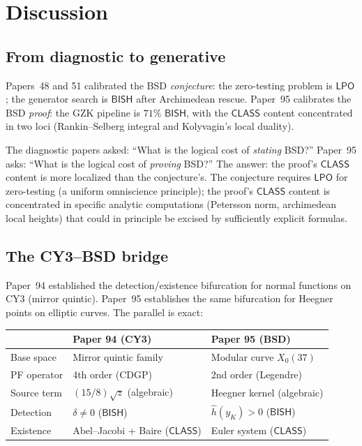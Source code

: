 \documentclass[11pt]{article}
\theoremstyle{plain}
\theoremstyle{definition}
\theoremstyle{remark}
\newcommand{\BISH}{\ensuremath{\mathsf{BISH}}}
\newcommand{\LPO}{\ensuremath{\mathsf{LPO}}}
\newcommand{\CLASS}{\ensuremath{\mathsf{CLASS}}}
\newcommand{\hhat}{\hat{h}}
\begin{document}
\section{Discussion}
\label{sec:discussion}

\subsection{From diagnostic to generative}

Papers~48 and 51 calibrated the BSD \emph{conjecture}: the zero-testing problem is $\LPO$; the generator search is $\BISH$ after Archimedean rescue. Paper~95 calibrates the BSD \emph{proof}: the GZK pipeline is $71\%$ $\BISH$, with the $\CLASS$ content concentrated in two loci (Rankin--Selberg integral and Kolyvagin's local duality).

The diagnostic papers asked: ``What is the logical cost of \emph{stating} BSD?'' Paper~95 asks: ``What is the logical cost of \emph{proving} BSD?'' The answer: the proof's $\CLASS$ content is more localized than the conjecture's. The conjecture requires $\LPO$ for zero-testing (a uniform omniscience principle); the proof's $\CLASS$ content is concentrated in specific analytic computations (Petersson norm, archimedean local heights) that could in principle be excised by sufficiently explicit formulas.

\subsection{The CY3--BSD bridge}

Paper~94 established the detection/existence bifurcation for normal functions on CY3 (mirror quintic). Paper~95 establishes the same bifurcation for Heegner points on elliptic curves. The parallel is exact:

\begin{center}
\begin{tabular}{lll}
\toprule
& \textbf{Paper 94 (CY3)} & \textbf{Paper 95 (BSD)} \\
\midrule
Base space & Mirror quintic family & Modular curve $X_0(37)$ \\
PF operator & 4th order (CDGP) & 2nd order (Legendre) \\
Source term & $(15/8)\sqrt{z}$ (algebraic) & Heegner kernel (algebraic) \\
Detection & $\delta \neq 0$ ($\BISH$) & $\hhat(y_K) > 0$ ($\BISH$) \\
Existence & Abel--Jacobi + Baire ($\CLASS$) & Euler system ($\CLASS$) \\
\bottomrule
\end{tabular}
\end{center}
\end{document}
